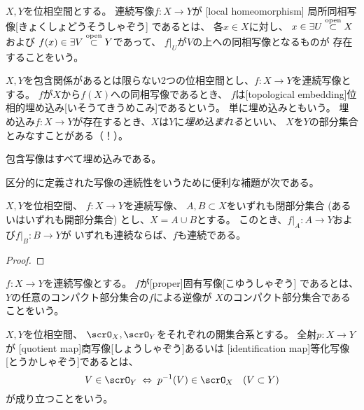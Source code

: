 \documentclass[report]{jlreq}
\begin{document}
\begin{definition}[局所同相写像]
    $X, Y$を位相空間とする。
    連続写像$f \colon X \to Y$が
    [local homeomorphism]
        {局所同相写像}[きょくしょどうそうしゃぞう]
    であるとは、
    各$x \in X$に対し、
    $x \in \exists U \stackrel{\text{open}}{\subset} X$および
    $f(x) \in \exists V \stackrel{\text{open}}{\subset} Y$であって、
    $f|_U$が$V$の上への同相写像となるものが
    存在することをいう。
\end{definition}

\begin{definition}[位相的埋め込み]
    $X, Y$を包含関係があるとは限らない2つの位相空間とし、$f \colon X \to Y$を連続写像とする。
    $f$が$X$から$f(X)$への同相写像であるとき、
    $f$は[topological embedding]{位相的埋め込み}[いそうてきうめこみ]であるという。
    単に埋め込みともいう。
    埋め込み$f \colon X \to Y$が存在するとき、$X$は$Y$に\emph{埋め込まれる}といい、
    $X$を$Y$の部分集合とみなすことがある（！）。
\end{definition}

\begin{example}[埋め込みの例]
    包含写像はすべて埋め込みである。
\end{example}

区分的に定義された写像の連続性をいうために便利な補題が次である。

\begin{lemma}[貼り合わせ補題]
    $X, Y$を位相空間、
    $f \colon X \to Y$を連続写像、
    $A, B \subset X$をいずれも閉部分集合
    (あるいはいずれも開部分集合) とし、$X = A \cup B$とする。
    このとき、$f|_A \colon A \to Y$および$f|_B \colon B \to Y$が
    いずれも連続ならば、$f$も連続である。
\end{lemma}

\begin{proof}
    \TODO{}
\end{proof}


\begin{definition}[固有写像]
    $f \colon X \to Y$を連続写像とする。
    $f$が[proper]{固有写像}[こゆうしゃぞう]
    であるとは、
    $Y$の任意のコンパクト部分集合の$f$による逆像が
    $X$のコンパクト部分集合であることをいう。
\end{definition}

\begin{definition}[商写像]
    $X, Y$を位相空間、
    $\scrO_X, \scrO_Y$をそれぞれの開集合系とする。
    全射$p \colon X \to Y$が
    [quotient map]{商写像}[しょうしゃぞう]あるいは
    [identification map]{等化写像}[とうかしゃぞう]であるとは、
    \begin{equation}
        V \in \scrO_Y
        \; \Leftrightarrow \;
        p^{-1}(V) \in \scrO_X
        \quad (V \subset Y)
    \end{equation}
    が成り立つことをいう。
\end{definition}
\end{document}
